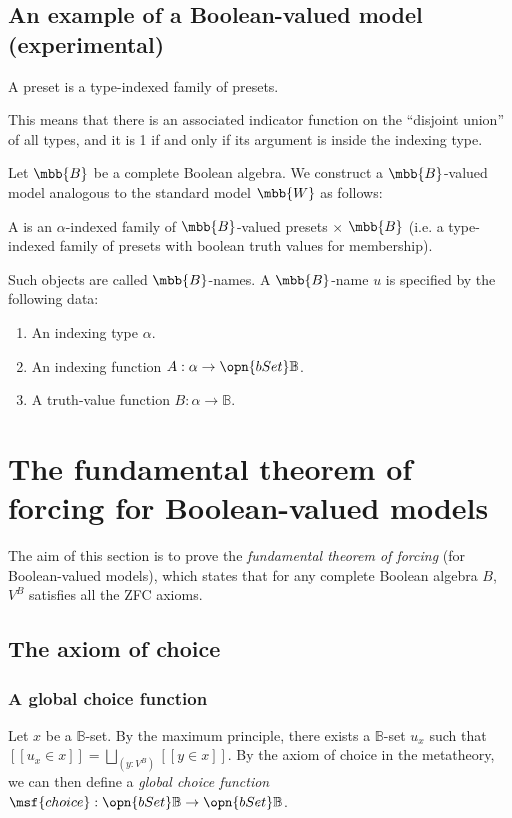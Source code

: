 \documentclass[11pt]{article}
\begin{document}
\subsection{An example of a Boolean-valued model (experimental)}

A preset is a type-indexed family of presets.

This means that there is an associated indicator function on the ``disjoint union'' of all types, and it is 1 if and only if its argument is inside the indexing type.

Let $\mbb{B}$ be a complete Boolean algebra. We construct a $\mbb{B}$-valued model analogous to the standard model $\mbb{W}$ as follows:

A  is an $\alpha$-indexed family of $\mbb{B}$-valued presets $ \times $ $\mbb{B}$ (i.e. a type-indexed family of presets with boolean truth values for membership).

Such objects are called $\mbb{B}$-names. A $\mbb{B}$-name $u$ is specified by the following data:
\begin{enumerate}
\item An indexing type $\alpha$.
\item An indexing function $A : \alpha \to \opn{bSet} \mathbb{B}$.
\item A truth-value function $B : \alpha \to \mathbb{B}$.
\end{enumerate}

\section{The fundamental theorem of forcing for Boolean-valued models}
The aim of this section is to prove the \emph{fundamental theorem of forcing} (for Boolean-valued models), which states that for any complete Boolean algebra $B$, $V^B$ satisfies all the ZFC axioms.

\newcommand{\B}{\mathbb{B}}

\subsection{The axiom of choice}
\subsubsection{A global choice function}

Let $x$ be a $\B$-set. By the maximum principle, there exists a $\B$-set $u_x$ such that
$[[u_x \in x]] = \bigsqcup_{(y : V^B)} [[y \in x]]$. By the axiom of choice in the metatheory, we can then define a \emph{global choice function} $\msf{choice} : \opn{bSet} \B \to \opn{bSet} \B$.
\end{document}
